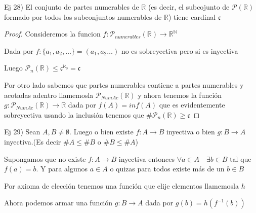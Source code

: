 \documentclass[12pt]{article}
\newcommand{\n}{\aleph_{0}}
\newcommand{\R}{\mathbb{R}}
\newcommand{\N}{\mathbb{N}}
\newcommand{\ra}{\rightarrow}
\theoremstyle{definition}
\begin{document}
\noindent Ej 28) El conjunto de partes numerables de $\R$ (es decir, el subcojunto de $\mathcal{P}(\R)$ formado por todos los subconjuntos numerables de $\R$) tiene cardinal $\mathfrak{c}$
\begin{proof}
  Consideremos la funcion $f: \mathcal{P}_{numerables}(\R) \ra \R^{\N}$ 

  Dada por $f : \{ a_{1},a_{2}, \dots \} = (a_{1},a_{2} \dots )$ no es sobreyectiva pero si es inyectiva

  Luego  $\mathcal{P}_{n}(\R) \leq \mathfrak{c}^{\n} = \mathfrak{c}$

  Por otro lado sabemos que partes numerables contiene a partes numerables y acotadas adentro llamemosla $\mathcal{P}_{NumAc}(\R)$ y ahora tenemos la función $g: \mathcal{P}_{NumAc}(\R) \ra \R$ dada por $f(A) = inf(A)$ que es evidentemente sobreyectiva usando la inclusión tenemos que $\# \mathcal{P}_{n}(\R) \geq \mathfrak{c}$

\end{proof}

\noindent Ej 29) Sean $A,B \neq \emptyset$. Luego o bien existe $f:A \ra B$ inyectiva o bien $g: B \ra A$ inyectiva.(Es decir $\#A \leq \# B$ o $\#B \leq \# A$) 

Supongamos que no existe $f: A \ra B$ inyectiva entonces $\forall a \in A \quad \exists b \in B $ tal que $f(a) = b$. Y para algunos $a \in A$ o quizas para todos existe más de un $b \in B$

Por axioma de elección tenemos una función que elije elementos llamemosla $h$

Ahora podemos armar una función $g: B \ra A$ dada por $g(b) = h ( f^{-1}(b)) $
\end{document}
